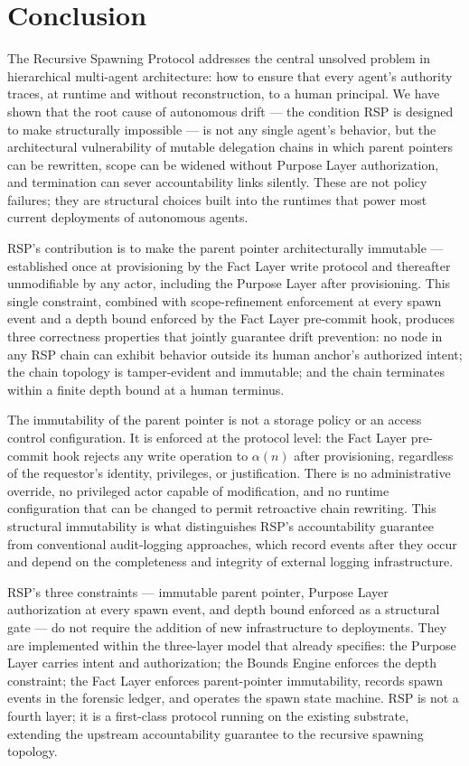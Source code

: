 \section{Conclusion}\label{sec:rs-conclusion}

The Recursive Spawning Protocol addresses the central unsolved problem in hierarchical multi-agent architecture: how to ensure that every agent's authority traces, at runtime and without reconstruction, to a human principal. We have shown that the root cause of autonomous drift — the condition RSP is designed to make structurally impossible — is not any single agent's behavior, but the architectural vulnerability of mutable delegation chains in which parent pointers can be rewritten, scope can be widened without Purpose Layer authorization, and termination can sever accountability links silently. These are not policy failures; they are structural choices built into the runtimes that power most current deployments of autonomous agents.

RSP's contribution is to make the parent pointer architecturally immutable — established once at provisioning by the Fact Layer write protocol and thereafter unmodifiable by any actor, including the Purpose Layer after provisioning. This single constraint, combined with scope-refinement enforcement at every spawn event and a depth bound enforced by the Fact Layer pre-commit hook, produces three correctness properties that jointly guarantee drift prevention: no node in any RSP chain can exhibit behavior outside its human anchor's authorized intent; the chain topology is tamper-evident and immutable; and the chain terminates within a finite depth bound at a human terminus.

The immutability of the parent pointer is not a storage policy or an access control configuration. It is enforced at the protocol level: the Fact Layer pre-commit hook rejects any write operation to $\alpha(n)$ after provisioning, regardless of the requestor's identity, privileges, or justification. There is no administrative override, no privileged actor capable of modification, and no runtime configuration that can be changed to permit retroactive chain rewriting. This structural immutability is what distinguishes RSP's accountability guarantee from conventional audit-logging approaches, which record events after they occur and depend on the completeness and integrity of external logging infrastructure.

RSP's three constraints — immutable parent pointer, Purpose Layer authorization at every spawn event, and depth bound enforced as a structural gate — do not require the addition of new infrastructure to \bxthree{} deployments. They are implemented within the three-layer model that \bxthree{} already specifies: the Purpose Layer carries intent and authorization; the Bounds Engine enforces the depth constraint; the Fact Layer enforces parent-pointer immutability, records spawn events in the forensic ledger, and operates the spawn state machine. RSP is not a fourth layer; it is a first-class protocol running on the existing substrate, extending the upstream accountability guarantee to the recursive spawning topology.

